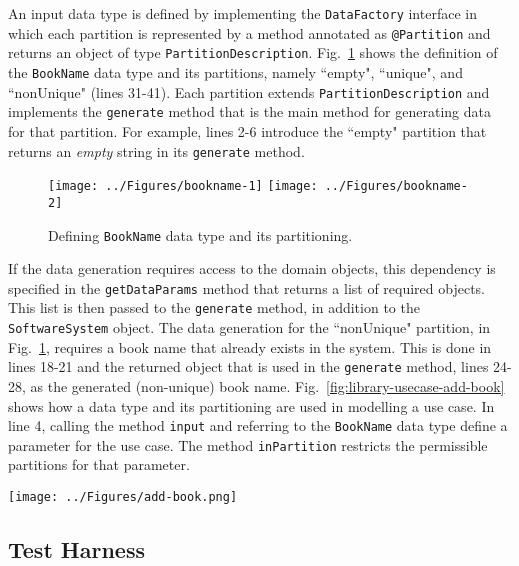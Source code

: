 An input data type is defined by implementing the \texttt{DataFactory} interface in which each partition is represented by a method annotated as \texttt{@Partition} and returns an object of type \texttt{PartitionDescription}. Fig.~\ref{fig:library-bookname} shows the definition of the \texttt{BookName} data type and its partitions, namely ``empty", ``unique", and ``nonUnique" (lines 31-41). Each partition extends  \texttt{PartitionDescription} and implements the \texttt{generate} method that is the main method for generating data for that partition. For example, lines 2-6 introduce the ``empty" partition that returns an \textit{empty} string in its \texttt{generate} method.

\begin{figure}[h]
\centering
{\texttt{[image: ../Figures/bookname-1]}%
\label{fig:library-bookname-1}}
\hfil
{\texttt{[image: ../Figures/bookname-2]}%
\label{fig:library-bookname-2}}
\caption{Defining \texttt{BookName} data type and its partitioning.}
\label{fig:library-bookname}
\end{figure} 

If the data generation requires access to the domain objects, this dependency is specified in the \texttt{getDataParams} method that returns a list of required objects. This list is then passed to the \texttt{generate} method, in addition to the \texttt{SoftwareSystem} object. The data generation for the ``nonUnique" partition, in Fig.~\ref{fig:library-bookname}, requires a book name that already exists in the system. This is done in lines 18-21 and the returned object that is used in the \texttt{generate} method, lines 24-28, as the generated (non-unique) book name. Fig.~\ref{fig:library-usecase-add-book} shows how a data type and its partitioning are used in modelling a use case. In line 4, calling the method \texttt{input} and referring to the \texttt{BookName} data type define a parameter for the use case. The method \texttt{inPartition} restricts the permissible partitions for that parameter.

\begin{figure*}[h]
\centering
\texttt{[image: ../Figures/add-book.png]}
\caption{Using the data types and their partitioning in use case modelling.}
\label{fig:library-usecase-add-book}
\end{figure*}

\subsection{Test Harness}
\label{sec:create-test model-test-harness}

